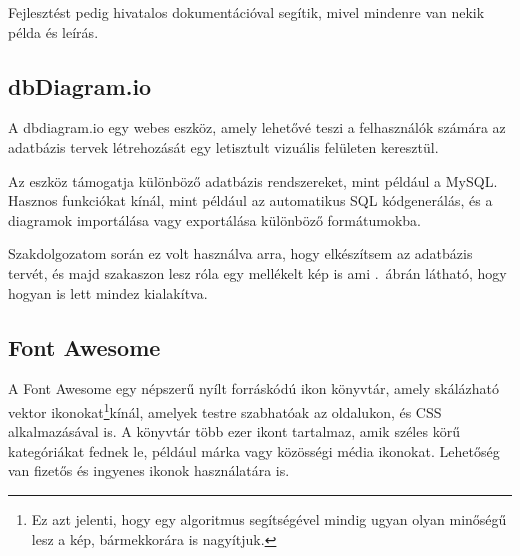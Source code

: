 \documentclass[
]{thesis-ekf}
\theoremstyle{definition}
\theoremstyle{remark}
\begin{document}
	Fejlesztést pedig hivatalos dokumentációval segítik, mivel mindenre van nekik példa és leírás.\cite{tailwind-docs}
	
	
	\subsection{dbDiagram.io}
	A dbdiagram.io egy webes eszköz, amely lehetővé teszi a felhasználók számára az adatbázis tervek létrehozását egy letisztult vizuális felületen keresztül. 
	
	Az eszköz támogatja különböző adatbázis rendszereket, mint például a MySQL. Hasznos funkciókat kínál, mint például az automatikus SQL kódgenerálás, és a diagramok importálása vagy exportálása különböző formátumokba.\cite{dbdiagram-io}
	
	Szakdolgozatom során ez volt használva arra, hogy elkészítsem az adatbázis tervét, és majd  szakaszon lesz róla egy mellékelt kép is ami .~ábrán látható, hogy hogyan is lett mindez kialakítva.
	
	\subsection{Font Awesome}
	A Font Awesome egy népszerű nyílt forráskódú ikon könyvtár, amely skálázható vektor ikonokat\footnote{Ez azt jelenti, hogy egy algoritmus segítségével mindig ugyan olyan minőségű lesz a kép, bármekkorára is nagyítjuk.}kínál, amelyek testre szabhatóak az oldalukon, és CSS alkalmazásával is. A könyvtár több ezer ikont tartalmaz, amik széles körű kategóriákat fednek le, például márka vagy közösségi média ikonokat. Lehetőség van fizetős és ingyenes ikonok használatára is.
	
\end{document}
